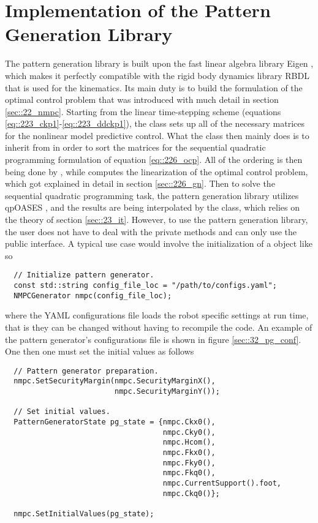 \FloatBarrier
\section{Implementation of the Pattern Generation Library}
\label{sec::32_pg}
The pattern generation library is built upon the fast linear algebra library Eigen \cite{eigenweb}, which makes it perfectly compatible with the rigid body dynamics library RBDL \cite{felis2017rbdl} that is used for the kinematics. Its main duty is to build the formulation of the optimal control problem that was introduced with much detail in section \ref{sec::22_nmpc}. Starting from the linear time-stepping scheme (equations \ref{eq::223_ckp1}-\ref{eq::223_ddckp1}), the  class sets up all of the necessary matrices for the nonlinear model predictive control. What the  class then mainly does is to inherit from  in order to sort the matrices for the sequential quadratic programming formulation of equation \ref{eq::226_ocp}. All of the ordering is then being done by , while  computes the linearization of the optimal control problem, which got explained in detail in section \ref{sec::226_gn}. Then to solve the sequential quadratic programming task, the pattern generation library utilizes qpOASES \cite{ferreau2014qpoases}, and the results are being interpolated by the  class, which relies on the theory of section \ref{sec::23_it}. However, to use the pattern generation library, the user does not have to deal with the private methods and can only use the public interface. A typical use case would involve the initialization of a  object like so
\begin{verbatim}
  // Initialize pattern generator.
  const std::string config_file_loc = "/path/to/configs.yaml";
  NMPCGenerator nmpc(config_file_loc);
\end{verbatim} 
where the YAML configurations file loads the robot specific settings at run time, that is they can be changed without having to recompile the code. An example of the pattern generator's configurations file is shown in figure \ref{sec::32_pg_conf}. One then one must set the initial values as follows
\begin{verbatim}
  // Pattern generator preparation.
  nmpc.SetSecurityMargin(nmpc.SecurityMarginX(), 
                         nmpc.SecurityMarginY());
	
  // Set initial values.
  PatternGeneratorState pg_state = {nmpc.Ckx0(),
                                    nmpc.Cky0(),
                                    nmpc.Hcom(),
                                    nmpc.Fkx0(),
                                    nmpc.Fky0(),
                                    nmpc.Fkq0(),
                                    nmpc.CurrentSupport().foot,
                                    nmpc.Ckq0()};

  nmpc.SetInitialValues(pg_state);
\end{verbatim}
